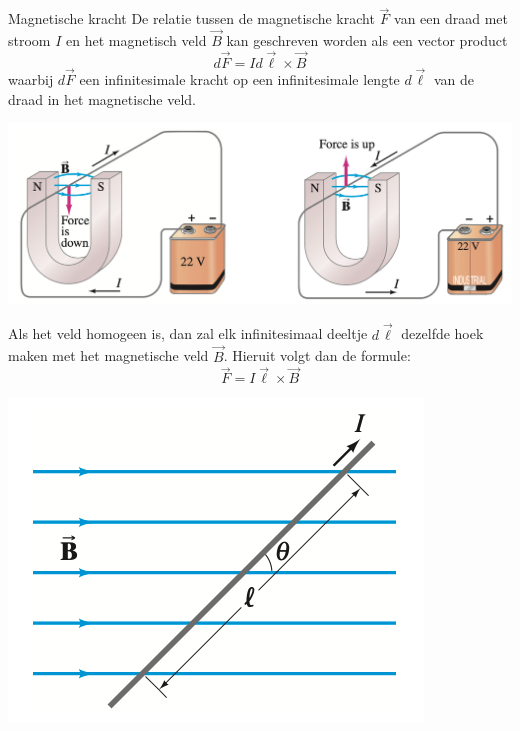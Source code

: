 \begin{theo}{Magnetische kracht}
    De relatie tussen de magnetische kracht $\Vec{F}$ van een draad met stroom $I$ en het magnetisch veld $\Vec{B}$ kan geschreven worden als een vector product
    \begin{equation*}
        d\Vec{F}= Id\Vec{\ell} \times \Vec{B}
    \end{equation*}
    waarbij $d\Vec{F}$ een infinitesimale kracht op een infinitesimale lengte $d\Vec{\ell}$ van de draad in het magnetische veld.
    \begin{center}
        \includegraphics[scale = 0.45]{Images/Magnetisme/MagnetischeKracht}
    \end{center}
    \begin{minipage}{.75\textwidth}
        Als het veld homogeen is, dan zal elk infinitesimaal deeltje $d\Vec{\ell}$ dezelfde hoek maken met het magnetische veld $\Vec{B}$.
        Hieruit volgt dan de formule:
        \begin{equation*}
            \Vec{F} = I\Vec{\ell} \times \Vec{B}
        \end{equation*}
    \end{minipage}
    \begin{minipage}{.21\textwidth}
        \includegraphics[scale = 0.25]{Images/Magnetisme/DraadHomogeenVeld}
    \end{minipage}
\end{theo}

